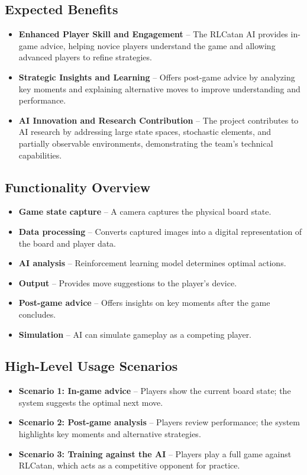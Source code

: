 \documentclass{article}
\begin{document}
\subsection{Expected Benefits}\label{subsec:expected-benefits}
\begin{itemize}
    \item \textbf{Enhanced Player Skill and Engagement} – The RLCatan AI provides in-game advice, helping novice players understand the game and allowing advanced players to refine strategies.
    \item \textbf{Strategic Insights and Learning} – Offers post-game advice by analyzing key moments and explaining alternative moves to improve understanding and performance.
    \item \textbf{AI Innovation and Research Contribution} – The project contributes to AI research by addressing large state spaces, stochastic elements, and partially observable environments, demonstrating the team's technical capabilities.
\end{itemize}

\subsection{Functionality Overview}\label{subsec:functionality-overview}
\begin{itemize}
    \item \textbf{Game state capture} – A camera captures the physical board state.
    \item \textbf{Data processing} – Converts captured images into a digital representation of the board and player data.
    \item \textbf{AI analysis} – Reinforcement learning model determines optimal actions.
    \item \textbf{Output} – Provides move suggestions to the player's device.
    \item \textbf{Post-game advice} – Offers insights on key moments after the game concludes.
    \item \textbf{Simulation} – AI can simulate gameplay as a competing player.
\end{itemize}

\subsection{High-Level Usage Scenarios}\label{subsec:high-level-usage-scenarios}
\begin{itemize}
    \item \textbf{Scenario 1: In-game advice} – Players show the current board state; the system suggests the optimal next move.
    \item \textbf{Scenario 2: Post-game analysis} – Players review performance; the system highlights key moments and alternative strategies.
    \item \textbf{Scenario 3: Training against the AI} – Players play a full game against RLCatan, which acts as a competitive opponent for practice.
\end{itemize}
\end{document}
